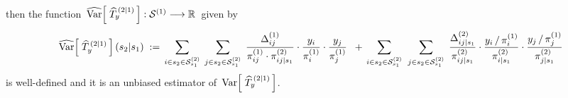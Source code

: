 \begin{theorem}
\begin{enumerate}
	then the function
	\,$\widehat{\textnormal{Var}}\!\left[\;\widehat{T}^{\,(2 \vert 1)}_{y}\,\right] : \mathcal{S}^{(1)} \longrightarrow \mathbb{R}$\,
	given by
	\begin{equation*}
	\widehat{\textnormal{Var}}\!\left[\;\widehat{T}^{\,(2 \vert 1)}_{y}\,\right](s_{2} \vert s_{1})
	\; := \,
		\underset{i \in s_{2} \in \mathcal{S}^{(2)}_{s_{1}} }{\sum}\;\,
		\underset{j \in s_{2} \in \mathcal{S}^{(2)}_{s_{1}} }{\sum}\;\,
			\dfrac{ \Delta^{(1)}_{ij} }{ \pi^{(1)}_{ij} \cdot \pi^{(2)}_{ij \vert s_{1}} }
			\cdot
			\dfrac{y_{i}}{\pi^{(1)}_{i}}
			\cdot
			\dfrac{y_{j}}{\pi^{(1)}_{j}}
		\;\; + \,
		\underset{i \in s_{2} \in \mathcal{S}^{(2)}_{s_{1}} }{\sum}\;\;
		\underset{j \in s_{2} \in \mathcal{S}^{(2)}_{s_{1}} }{\sum}\;\,
			\dfrac{ \Delta^{(2)}_{ij \vert s_{1}} }{ \pi^{(2)}_{ij \vert s_{1}} }
			\cdot
			\dfrac{ y_{i} \,/\, \pi^{(1)}_{i} }{ \pi^{(2)}_{i \vert s_{1}} }
			\cdot
			\dfrac{ y_{j} \,/\, \pi^{(1)}_{j} }{ \pi^{(2)}_{j \vert s_{1}} }
	\end{equation*}
	is well-defined and it is an unbiased estimator of \,$\textnormal{Var}\!\left[\;\widehat{T}^{\,(2 \vert 1)}_{y}\,\right]$.
\end{enumerate}
\end{theorem}
\proof
